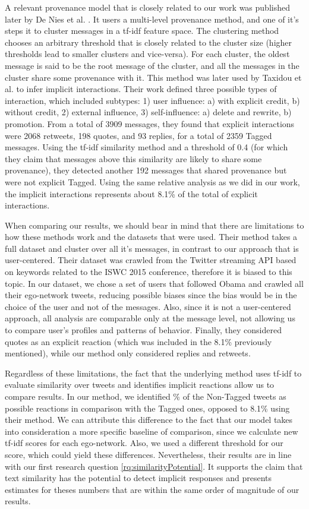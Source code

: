 A relevant provenance model that is closely related to our work was published later by De Nies et al. \cite{de2015}. It users a multi-level provenance method, and one of it's steps it to cluster messages in a tf-idf feature space. The clustering method chooses an arbitrary threshold that is closely related to the cluster size (higher thresholds lead to smaller clusters and vice-versa). For each cluster, the oldest message is said to be the root message of the cluster, and all the messages in the cluster share some provenance with it. This method was later used by Taxidou et al. \cite{taxidou2016} to infer implicit interactions. Their work defined three possible types of interaction, which included subtypes: 1) user influence: a) with explicit credit, b) without credit, 2) external influence, 3) self-influence: a) delete and rewrite, b) promotion. From a total of 3909 messages, they found that explicit interactions were 2068 retweets, 198 quotes, and 93 replies, for a total of 2359 Tagged messages. Using the tf-idf similarity method and a threshold of 0.4 (for which they claim that messages above this similarity are likely to share some provenance), they detected another 192 messages that shared provenance but were not explicit Tagged. Using the same relative analysis as we did in our work, the implicit interactions represents about 8.1\% of the total of explicit interactions.

When comparing our results, we should bear in mind that there are limitations to how these methods work and the datasets that were used. Their method takes a full dataset and cluster over all it's messages, in contrast to our approach that is user-centered. Their dataset was crawled from the Twitter streaming API based on keywords related to the ISWC 2015 conference, therefore it is biased to this topic. In our dataset, we chose a set of users that followed Obama and crawled all their ego-network tweets, reducing possible biases since the bias would be in the choice of the user and not of the messages. Also, since it is not a user-centered approach, all analysis are comparable only at the message level, not allowing us to compare user's profiles and patterns of behavior. Finally, they considered quotes as an explicit reaction (which was included in the 8.1\% previously mentioned), while our method only considered replies and retweets.

Regardless of these limitations, the fact that the underlying method uses tf-idf to evaluate similarity over tweets and identifies implicit reactions allow us to compare results. In our method, we identified \highNonTaggedTweetCountPct{}\% of the Non-Tagged tweets as possible reactions in comparison with the Tagged ones, opposed to 8.1\% using their method. We can attribute this difference to the fact that our model takes into consideration a more specific baseline of comparison, since we calculate new tf-idf scores for each ego-network. Also, we used a different threshold for our score, which could yield these differences. Nevertheless, their results are in line with our first research question \ref{rq:similarityPotential}. It supports the claim that text similarity has the potential to detect implicit responses and presents estimates for theses numbers that are within the same order of magnitude of our results.


